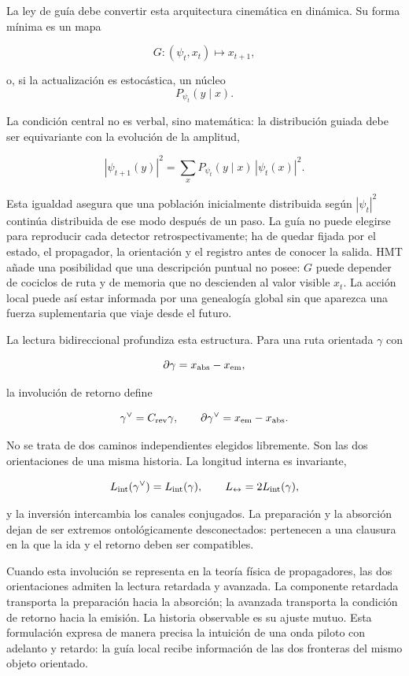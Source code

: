 La ley de guía debe convertir esta arquitectura cinemática en dinámica. Su forma
mínima es un mapa

\[
  G:(\psi_t,x_t)\longmapsto x_{t+1},
\]

o, si la actualización es estocástica, un núcleo
\[
  P_{\psi_t}(y\mid x).
\]

La condición central no es verbal, sino matemática: la distribución guiada debe ser
equivariante con la evolución de la amplitud,

\[
  |\psi_{t+1}(y)|^2
  =
  \sum_x P_{\psi_t}(y\mid x)\,|\psi_t(x)|^2.
\]

Esta igualdad asegura que una población inicialmente distribuida según
\(|\psi_t|^2\) continúa distribuida de ese modo después de un paso. La guía no puede
elegirse para reproducir cada detector retrospectivamente; ha de quedar fijada por
el estado, el propagador, la orientación y el registro antes de conocer la salida.
HMT añade una posibilidad que una descripción puntual no posee: \(G\) puede
depender de cociclos de ruta y de memoria que no descienden al valor visible
\(x_t\). La acción local puede así estar informada por una genealogía global sin que
aparezca una fuerza suplementaria que viaje desde el futuro.

La lectura bidireccional profundiza esta estructura. Para una ruta orientada
\(\gamma\) con

\[
  \partial\gamma=x_{\rm abs}-x_{\rm em},
\]

la involución de retorno define

\[
  \gamma^\vee=C_{\rm rev}\gamma,
  \qquad
  \partial\gamma^\vee=x_{\rm em}-x_{\rm abs}.
\]

No se trata de dos caminos independientes elegidos libremente. Son las dos
orientaciones de una misma historia. La longitud interna es invariante,

\[
  L_{\rm int}(\gamma^\vee)=L_{\rm int}(\gamma),
  \qquad
  L_{\leftrightarrow}=2L_{\rm int}(\gamma),
\]

y la inversión intercambia los canales conjugados. La preparación y la absorción
dejan de ser extremos ontológicamente desconectados: pertenecen a una clausura en
la que la ida y el retorno deben ser compatibles.

Cuando esta involución se representa en la teoría física de propagadores, las dos
orientaciones admiten la lectura retardada y avanzada. La componente retardada
transporta la preparación hacia la absorción; la avanzada transporta la condición
de retorno hacia la emisión. La historia observable es su ajuste mutuo. Esta
formulación expresa de manera precisa la intuición de una onda piloto con adelanto
y retardo: la guía local recibe información de las dos fronteras del mismo objeto
orientado.

